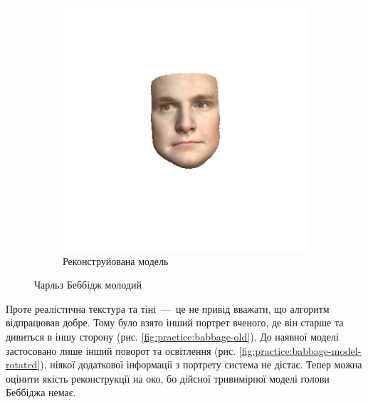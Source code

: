 \begin{figure}[h]
\begin{subfigure}[b]{0.4\textwidth}
    \includegraphics[width=\textwidth]{images/babbage-model}
    \caption{Реконструйована модель}
    \label{fig:practice:babbage-model}
  \end{subfigure}
  \caption{Чарльз Беббідж молодий}
\end{figure}

Проте реалістична текстура та тіні~---~це не привід вважати,
що алгоритм відпрацював добре.
Тому було взято інший портрет вченого,
де він старше та дивиться в іншу сторону
(рис. \ref{fig:practice:babbage-old}).
До наявної моделі застосовано лише інший поворот та освітлення
(рис. \ref{fig:practice:babbage-model-rotated}),
ніякої додаткової інформації з портрету система не дістає.
Тепер можна оцінити якість реконструкції на око,
бо дійсної тривимірної моделі голови Беббіджа немає.

